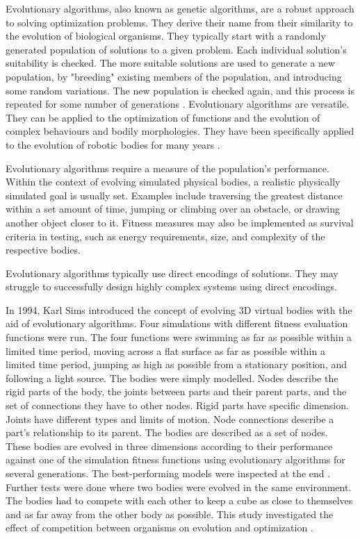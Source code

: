 Evolutionary algorithms, also known as genetic algorithms, are a robust approach to solving optimization problems. They derive their name from their similarity to the evolution of biological organisms. They typically start with a randomly generated population of solutions to a given problem. Each individual solution's suitability is checked. The more suitable solutions are used to generate a new population, by "breeding" existing members of the population, and introducing some random variations. The new population is checked again, and this process is repeated for some number of generations \citep{Groenwold1999}. Evolutionary algorithms are versatile. They can be applied to the optimization of functions and the evolution of complex behaviours and bodily morphologies. They have been specifically applied to the evolution of robotic bodies for many years \citep{Sims1994a,Sims1994b}.

Evolutionary algorithms require a measure of the population's performance. Within the context of evolving simulated physical bodies, a realistic physically simulated goal is usually set. Examples include traversing the greatest distance within a set amount of time, jumping or climbing over an obstacle, or drawing another object closer to it. Fitness measures may also be implemented as survival criteria in testing, such as energy requirements, size, and complexity of the respective bodies. \citep{Sims1994a, Sims1994b}

Evolutionary algorithms typically use direct encodings of solutions. They may struggle to successfully design highly complex systems using direct encodings. \citep{Hornby2001b}

In 1994, Karl Sims introduced the concept of evolving 3D virtual bodies with the aid of evolutionary algorithms. Four simulations with different fitness evaluation functions were run. The four functions were swimming as far as possible within a limited time period, moving across a flat surface as far as possible within a limited time period, jumping as high as possible from a stationary position, and following a light source. The bodies were simply modelled. Nodes describe the rigid parts of the body, the joints between parts and their parent parts, and the set of connections they have to other nodes. Rigid parts have specific dimension. Joints have different types and limits of motion. Node connections describe a part's relationship to its parent. The bodies are described as a set of nodes. These bodies are evolved in three dimensions according to their performance against one of the simulation fitness functions using evolutionary algorithms for several generations. The best-performing models were inspected at the end \citep{Sims1994a}. Further tests were done where two bodies were evolved in the same environment. The bodies had to compete with each other to keep a cube as close to themselves and as far away from the other body as possible. This study investigated the effect of competition between organisms on evolution and optimization \citep{Sims1994b}.

